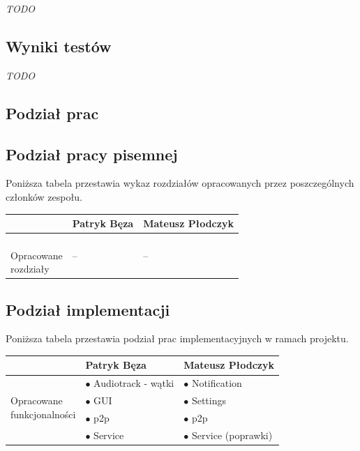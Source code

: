 \documentclass[a4paper,titlepage]{article}
\theoremstyle{break}
\begin{document}
\emph{TODO}


\subsection{Wyniki testów}

\emph{TODO}


\newpage

\begin{appendices}

\section{Podział prac}
\subsection{Podział pracy pisemnej}

Poniższa tabela przestawia wykaz rozdziałów opracowanych przez poszczególnych członków zespołu.

\begin{table}[H]
\center
\begin{tabular}{p{2.5cm}|p{5cm}|p{5cm}}
& Patryk Bęza & Mateusz Płodczyk \\\hline\hline
\parbox{3cm}{\ \\Opracowane \\rozdziały} & -- & --\\
\end{tabular}
\end{table}

\subsection{Podział implementacji}

Poniższa tabela przestawia podział prac implementacyjnych w ramach projektu.

\begin{table}[H]
\center
\begin{tabular}{p{2.5cm}|p{5cm}|p{5cm}}
& Patryk Bęza & Mateusz Płodczyk \\\hline\hline
\multirow{3}{*}{\parbox{3cm}{\ \\Opracowane \\funkcjonalności}} & $\bullet$ Audiotrack - wątki & $\bullet$ Notification\\
& $\bullet$ GUI & $\bullet$ Settings \\
& $\bullet$ p2p & $\bullet$ p2p \\
& $\bullet$ Service & $\bullet$ Service (poprawki) \\
\end{tabular}
\end{table}

\end{appendices}


\end{document}
